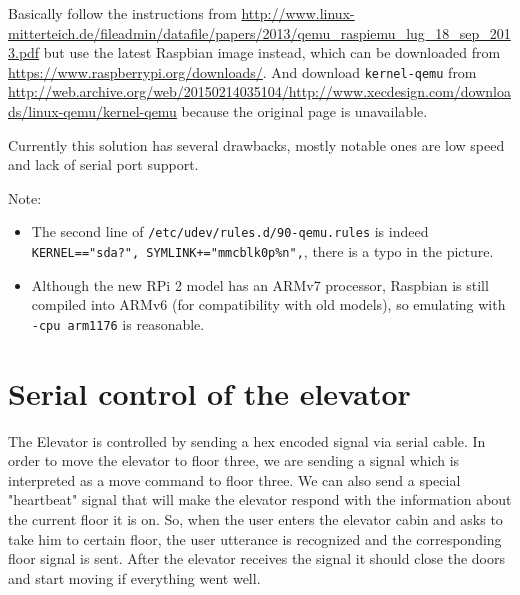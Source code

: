 \documentclass[a4paper, 12pt]{article}
\begin{document}
Basically follow the instructions from \url{http://www.linux-mitterteich.de/fileadmin/datafile/papers/2013/qemu_raspiemu_lug_18_sep_2013.pdf} but use the latest Raspbian image instead, which can be downloaded from \url{https://www.raspberrypi.org/downloads/}.
And download \texttt{kernel-qemu} from \url{http://web.archive.org/web/20150214035104/http://www.xecdesign.com/downloads/linux-qemu/kernel-qemu} because the original page is unavailable.

Currently this solution has several drawbacks, mostly notable ones are low speed and lack of serial port support.

\vspace{\baselineskip}

Note:

\begin{itemize}
\item The second line of \texttt{/etc/udev/rules.d/90-qemu.rules} is indeed \texttt{KERNEL=="sda?", SYMLINK+="mmcblk0p\%n",}, there is a typo in the picture.
\item Although the new RPi 2 model has an ARMv7 processor, Raspbian is still compiled into ARMv6 (for compatibility with old models), so emulating with \texttt{-cpu arm1176} is reasonable.
\end{itemize}

\section{Serial control of the elevator}
\label{sec:Serial_control_of_the_elevator}
The Elevator is controlled by sending a hex encoded signal via serial cable.
In order to move the elevator to floor three, we are sending a signal which is interpreted as a move command to floor three.
We can also send a special "heartbeat" signal that will make the elevator respond with the information about the current floor it is on.
So, when the user enters the elevator cabin and asks to take him to certain floor, the user utterance is recognized and the corresponding floor signal is sent.
After the elevator receives the signal it should close the doors and start moving if everything went well.

\end{document}
